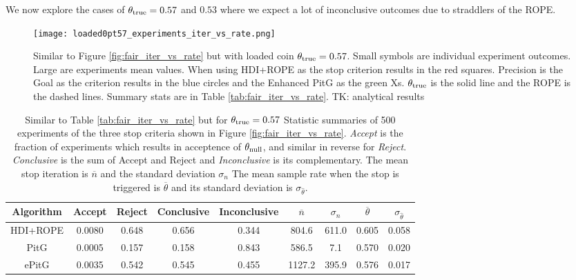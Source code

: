 We now explore the cases of $\theta_{\rm true}=0.57$ and $0.53$
where we expect a lot of inconclusive outcomes due to straddlers of the ROPE.


\begin{figure}[h!]
  \centering
  \texttt{[image: loaded0pt57\_experiments\_iter\_vs\_rate.png]}
  \caption{Similar to Figure \ref{fig:fair_iter_vs_rate} but with
  loaded coin $\theta_{\rm true}=0.57$.
  Small symbols are individual experiment outcomes. Large are experiments
  mean values. When using HDI+ROPE as the stop criterion results in the red squares.
  Precision is the Goal as the criterion results in the blue circles
  and the Enhanced PitG as the green Xs. $\theta_{\rm true}$ is the solid line and
  the ROPE is the dashed lines. Summary stats are in Table \ref{tab:fair_iter_vs_rate}. TK: analytical results
  }
  \label{fig:loaded0pt57_iter_vs_rate}
\end{figure}


\begin{table}[h!]\label{tab:loaded0pt57_iter_vs_rate}
  \begin{center}
  \begin{tabular}{c|c|c|c|c|c|c|c|c}
    \hline
    Algorithm & Accept & Reject & Conclusive & Inconclusive & $\overline{n}$ & $\sigma_n$ & $\overline{\theta}$ & $\sigma_{\hat{\theta}}$\\
    \hline
    HDI+ROPE & 0.0080	& 0.648 &	0.656 &	0.344 &	804.6	& 611.0	& 0.605	& 0.058 \\
    PitG & 0.0005 &	0.157 &	0.158 &	0.843	& 586.5	& 7.1 &	0.570 &	0.020\\
    ePitG & 0.0035 &	0.542 &	0.545 & 	0.455 &	1127.2 &	395.9	& 0.576 &	0.017  \\
    \hline
  \end{tabular}
  \caption{Similar to Table \ref{tab:fair_iter_vs_rate} but for $\theta_{\rm true}=0.57$ Statistic summaries of 500 experiments of the three stop criteria shown in
  Figure \ref{fig:fair_iter_vs_rate}. {\it Accept}
  is the fraction of experiments which results in acceptence of $\theta_{\rm null}$,
  and similar in reverse for {\it Reject}. {\it Conclusive} is the sum of Accept
  and Reject and {\it Inconclusive} is its complementary.
  The mean stop iteration is $\overline{n}$ and the standard deviation $\sigma_n$
  The mean sample rate when the stop is triggered is $\overline{\theta}$ and its standard deviation is $\sigma_{\hat{\theta}}$.
  }
\end{center}
\end{table}

